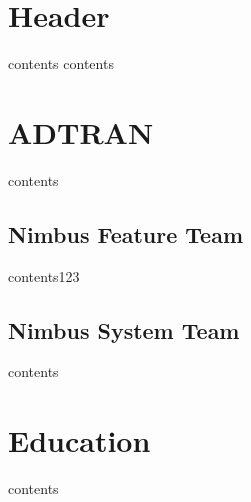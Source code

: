 \documentclass{article}
\begin{document}
\section{Header}
  contents contents
\section{ADTRAN}
  contents

\subsection{Nimbus Feature Team}
  contents123
\subsection{Nimbus System Team}
  contents

\section{Education}
  contents
\end{document}
